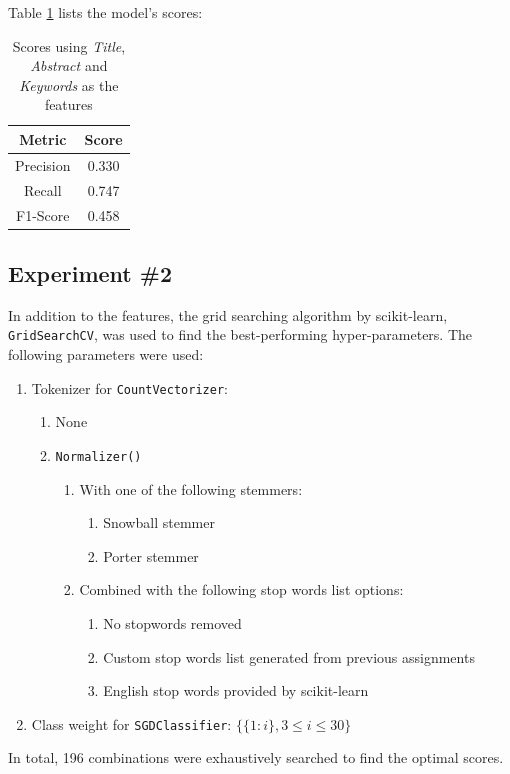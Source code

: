 \documentclass[11pt]{article}
\begin{document}
Table \ref{table:gs0_score} lists the model's scores:
\begin{table}[!ht]
    \caption{Scores using \textit{Title}, \textit{Abstract} and \textit{Keywords} as the features}
    \label{table:gs0_score}
    \begin{center}

        \begin{tabular}{| c | c |}
        \hline
        \textbf{Metric} & \textbf{Score}
        \\ \hline
        Precision & 0.330 
        \\ \hline
        Recall & 0.747
        \\ \hline
        F1-Score & 0.458
        \\ \hline
        \end{tabular}

    \end{center}

\end{table}

\subsection*{Experiment \#2}
In addition to the features, the grid searching algorithm by scikit-learn, \texttt{GridSearchCV}, was used to find the best-performing hyper-parameters. The following parameters were used:
\begin{enumerate}
    \item Tokenizer for \texttt{CountVectorizer}:
    \begin{enumerate}
            \item None
            \item \texttt{Normalizer()}
            \begin{enumerate}
                \item With one of the following stemmers:
                \begin{enumerate}
                    \item Snowball stemmer
                    \item Porter stemmer
                \end{enumerate}
                \item Combined with the following stop words list options:
                \begin{enumerate}
                    \item No stopwords removed
                    \item Custom stop words list generated from previous assignments
                    \item English stop words provided by scikit-learn
                \end{enumerate}
            \end{enumerate}
        \end{enumerate}
    \item Class weight for \texttt{SGDClassifier}: $\{\{1: i\}, 3 \le i \le 30\}$
\end{enumerate}
In total, 196 combinations were exhaustively searched to find the optimal scores.
\end{document}
